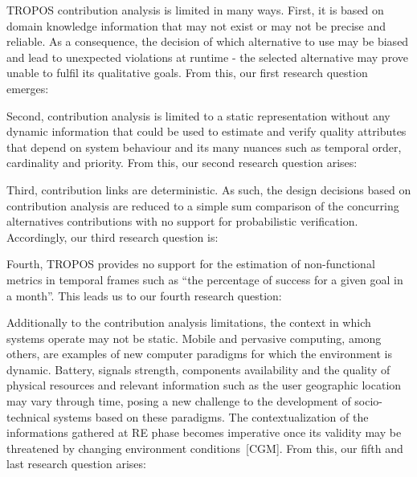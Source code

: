 TROPOS contribution analysis is limited in many ways. First, it is based on domain knowledge information that may not exist or may not be precise and reliable. As a consequence, the decision of which alternative to use may be biased and lead to unexpected violations at runtime - the selected alternative may prove unable to fulfil its qualitative goals. From this, our first research question emerges:
\bigskip

\setlength{\fboxsep}{10pt}
\noindent{}\bigskip

Second, contribution analysis is limited to a static representation without any dynamic information that could be used to estimate and verify quality attributes that depend on system behaviour and its many nuances such as temporal order, cardinality and priority. From this, our second research question arises: 
\bigskip

\noindent{}\bigskip

Third, contribution links are deterministic. As such, the design decisions based on contribution analysis are reduced to a simple sum comparison of the concurring alternatives contributions with no support for probabilistic verification. Accordingly, our third research question is:
\bigskip

\noindent{}\bigskip

Fourth, TROPOS provides no support for the estimation of non-functional metrics in temporal frames such as ``the percentage of success for a given goal in a month''. This leads us to our fourth research question:
\bigskip

\noindent{}\bigskip

Additionally to the contribution analysis limitations, the context in which systems operate may not be static. Mobile and pervasive computing, among others, are examples of new computer paradigms for which the environment is dynamic. Battery, signals strength, components availability and the quality of physical resources and relevant information such as the user geographic location may vary through time, posing a new challenge to the development of socio-technical systems based on these paradigms. The contextualization of the informations gathered at RE phase becomes imperative once its validity may be threatened by changing environment conditions~[CGM]. From this, our fifth and last research question arises:
\bigskip

